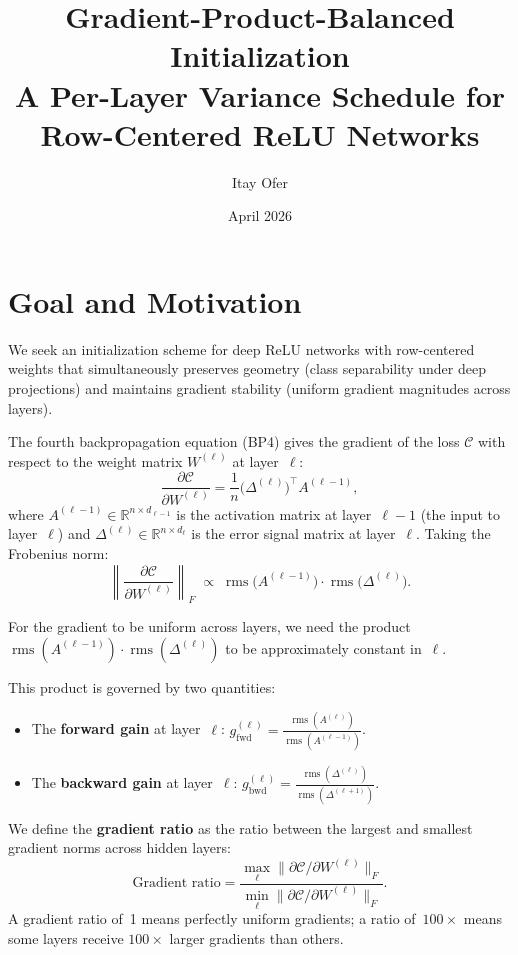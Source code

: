 \documentclass[11pt,a4paper]{article}
\title{%
  Gradient-Product-Balanced Initialization\\[4pt]
  {\large A Per-Layer Variance Schedule for Row-Centered ReLU Networks}
}
\author{Itay Ofer}
\date{April 2026}
\theoremstyle{definition}
\newcommand{\R}{\mathbb{R}}
\newcommand{\rms}{\operatorname{rms}}
\begin{document}
\maketitle
\tableofcontents
\newpage

\section{Goal and Motivation}
\label{sec:motivation}

We seek an initialization scheme for deep ReLU networks with
row-centered weights that simultaneously preserves geometry
(class separability under deep projections) and maintains
gradient stability (uniform gradient magnitudes across layers).

The fourth backpropagation equation (BP4) gives the gradient
of the loss $\mathcal{C}$ with respect to the weight matrix
$W^{(\ell)}$ at layer~$\ell$:
\begin{equation}\label{eq:bp4}
  \frac{\partial \mathcal{C}}{\partial W^{(\ell)}}
  = \frac{1}{n}\bigl(\Delta^{(\ell)}\bigr)^{\!\top}\! A^{(\ell-1)},
\end{equation}
where $A^{(\ell-1)} \in \R^{n \times d_{\ell-1}}$ is the activation matrix
at layer~$\ell-1$ (the input to layer~$\ell$) and
$\Delta^{(\ell)} \in \R^{n \times d_\ell}$ is the error signal matrix at
layer~$\ell$.  Taking the Frobenius norm:
\begin{equation}\label{eq:grad-mag}
  \left\|\frac{\partial \mathcal{C}}{\partial W^{(\ell)}}\right\|_F
  \;\propto\; \rms\!\bigl(A^{(\ell-1)}\bigr) \cdot \rms\!\bigl(\Delta^{(\ell)}\bigr).
\end{equation}

For the gradient to be uniform across layers, we need the
product $\rms(A^{(\ell-1)}) \cdot \rms(\Delta^{(\ell)})$
to be approximately constant in~$\ell$.

This product is governed by two quantities:
\begin{itemize}[nosep]
  \item The \textbf{forward gain} at layer~$\ell$:
    $\displaystyle g_{\mathrm{fwd}}^{(\ell)}
     = \frac{\rms(A^{(\ell)})}{\rms(A^{(\ell-1)})}$.
  \item The \textbf{backward gain} at layer~$\ell$:
    $\displaystyle g_{\mathrm{bwd}}^{(\ell)}
     = \frac{\rms(\Delta^{(\ell)})}{\rms(\Delta^{(\ell+1)})}$.
\end{itemize}

We define the \textbf{gradient ratio} as the ratio between the
largest and smallest gradient norms across hidden layers:
\begin{equation}\label{eq:grad-ratio}
  \text{Gradient ratio}
  = \frac{\max_\ell \|\partial \mathcal{C} / \partial W^{(\ell)}\|_F}
         {\min_\ell \|\partial \mathcal{C} / \partial W^{(\ell)}\|_F}.
\end{equation}
A gradient ratio of~1 means perfectly uniform gradients; a ratio
of~$100\times$ means some layers receive $100\times$ larger
gradients than others.
\end{document}
